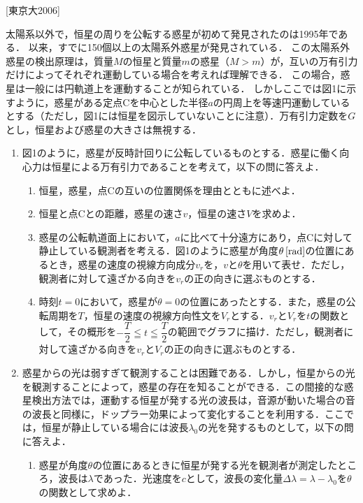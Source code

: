


\noindent
{} [東京大2006]

太陽系以外で，恒星の周りを公転する惑星が初めて発見されたのは1995年である．
以来，すでに150個以上の太陽系外惑星が発見されている．
この太陽系外惑星の検出原理は，質量$M$の恒星と質量$m$の惑星（$M > m$）が，互いの万有引力だけによってそれぞれ運動している場合を考えれば理解できる．
この場合，惑星は一般には円軌道上を運動することが知られている．
しかしここでは図1に示すように，惑星がある定点Cを中心とした半径$a$の円周上を等速円運動しているとする（ただし，図1には恒星を図示していないことに注意）．万有引力定数を$G$とし，恒星および惑星の大きさは無視する．

\begin{enumerate}[label=\textbf{問\arabic*}]
  \item {\hzw}図1のように，惑星が反時計回りに公転しているものとする．惑星に働く向心力は恒星による万有引力であることを考えて，以下の問に答えよ．
  \begin{enumerate}[(1)]
    \item {\hzw}恒星，惑星，点Cの互いの位置関係を理由とともに述べよ．
    \item {\hzw}恒星と点Cとの距離，惑星の速さ$v$，恒星の速さ$V$を求めよ．
    \item {\hzw}惑星の公転軌道面上において，$a$に比べて十分遠方にあり，点Cに対して静止している観測者を考える．図1のように惑星が角度$\theta \, [\mathrm{rad}]$の位置にあるとき，惑星の速度の視線方向成分$v_r$を，$v$と$\theta$を用いて表せ．ただし，観測者に対して遠ざかる向きを$v_r$の正の向きに選ぶものとする．
    \item {\hzw}時刻$t = 0$において，惑星が$\theta = 0$の位置にあったとする．また，惑星の公転周期を$T$，恒星の速度の視線方向性文を$V_r$とする．$v_r$と$V_r$を$t$の関数として，その概形を$-\dfrac{T}{2} \leqq t \leqq \dfrac{T}{2}$の範囲でグラフに描け．ただし，観測者に対して遠ざかる向きを$v_r$と$V_r$の正の向きに選ぶものとする．
    \end{enumerate}
    \item {\hzw}惑星からの光は弱すぎて観測することは困難である．しかし，恒星からの光を観測することによって，惑星の存在を知ることができる．この間接的な惑星検出方法では，運動する恒星が発する光の波長は，音源が動いた場合の音の波長と同様に，ドップラー効果によって変化することを利用する．ここでは，恒星が静止している場合には波長$\lambda_0$の光を発するものとして，以下の問に答えよ．
    \begin{enumerate}[(1)]
      \item {\hzw}惑星が角度$\theta$の位置にあるときに恒星が発する光を観測者が測定したところ，波長は$\lambda$であった．光速度を$c$として，波長の変化量$\varDelta \lambda = \lambda - \lambda_0$を$\theta$の関数として求めよ．

\end{enumerate}
\end{enumerate}

